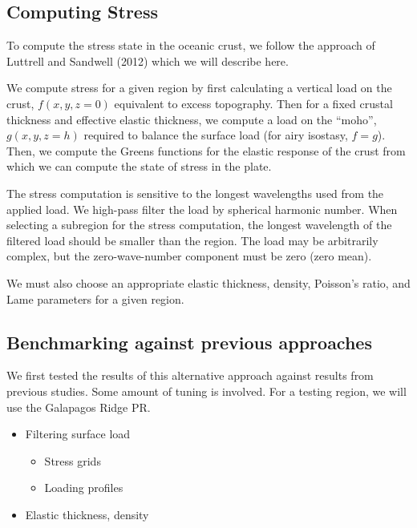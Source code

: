 \documentclass{article}
\begin{document}
\subsection{Computing Stress}
To compute the stress state in the oceanic crust, we follow the approach of Luttrell and Sandwell (2012) which we will describe here.

We compute stress for a given region by first calculating a vertical load on the crust, $f(x,y,z=0)$ equivalent to excess topography. Then for a fixed crustal thickness and effective elastic thickness, we compute a load on the ``moho'', $g(x,y,z=h)$ required to balance the surface load (for airy isostasy, $f=g$). Then, we compute the Greens functions for the elastic response of the crust from which we can compute the state of stress in the plate.

The stress computation is sensitive to the longest wavelengths used from the applied load. We high-pass filter the load by spherical harmonic number. When selecting a subregion for the stress computation, the longest wavelength of the filtered load should be smaller than the region. The load may be arbitrarily complex, but the zero-wave-number component must be zero (zero mean).

We must also choose an appropriate elastic thickness, density, Poisson's ratio, and Lame parameters for a given region.

\subsection{Benchmarking against previous approaches}
We first tested the results of this alternative approach against results from previous studies. Some amount of tuning is involved. For a testing region, we will use the Galapagos Ridge PR.
\begin{itemize}
	\item Filtering surface load
	\begin{itemize}
		\item Stress grids
		\item Loading profiles
	\end{itemize}
	\item Elastic thickness, density
\end{itemize}
\end{document}
